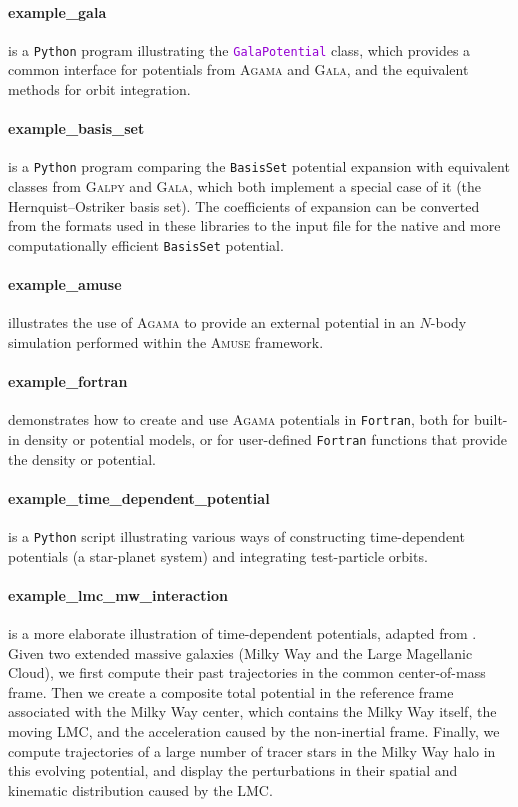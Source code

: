 \documentclass[12pt]{article}
\newcommand{\Agama}{\textsc{Agama}\xspace}
\newcommand{\Amuse}{\textsc{Amuse}\xspace}
\newcommand{\Galpy}{\textsc{Galpy}\xspace}
\newcommand{\Gala} {\textsc{Gala}\xspace}
\newcommand{\Python}{\texttt{Python}\xspace}
\newcommand{\Fortran}{\texttt{Fortran}\xspace}
\newcommand{\ttt}[1]{\textcolor{darkviolet}{\texttt{#1}}}
\newcommand{\ppp}[1]{\textcolor{darkolive} {\texttt{#1}}}
\let\oldparagraph\paragraph
\renewcommand{\paragraph}[1]{\vspace{-2mm}\oldparagraph{#1}}
\begin{document}
\paragraph{example_gala} is a \Python program illustrating the \ttt{GalaPotential} class, which provides a common interface for potentials from \Agama and \Gala, and the equivalent methods for orbit integration.

\paragraph{example_basis_set} is a \Python program comparing the \ppp{BasisSet} potential expansion with equivalent classes from \Galpy and \Gala, which both implement a special case of it (the Hernquist--Ostriker basis set). The coefficients of expansion can be converted from the formats used in these libraries to the input file for the native and more computationally efficient \ppp{BasisSet} potential.

\paragraph{example_amuse} illustrates the use of \Agama to provide an external potential in an $N$-body simulation performed within the \Amuse framework.

\paragraph{example_fortran} demonstrates how to create and use \Agama potentials in \Fortran, both for built-in density or potential models, or for user-defined \Fortran functions that provide the density or potential.

\paragraph{example_time_dependent_potential} is a \Python script illustrating various ways of constructing time-dependent potentials (a star-planet system) and integrating test-particle orbits.

\paragraph{example_lmc_mw_interaction} is a more elaborate illustration of time-dependent potentials, adapted from \cite{Vasiliev2021}. Given two extended massive galaxies (Milky Way and the Large Magellanic Cloud), we first compute their past trajectories in the common center-of-mass frame. Then we create a composite total potential in the reference frame associated with the Milky Way center, which contains the Milky Way itself, the moving LMC, and the acceleration caused by the non-inertial frame. Finally, we compute trajectories of a large number of tracer stars in the Milky Way halo in this evolving potential, and display the perturbations in their spatial and kinematic distribution caused by the LMC. 
\end{document}
